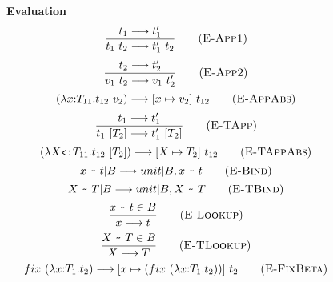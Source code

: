 \documentclass{report}
\newcommand{\subty}{\texttt{{\raisebox{-.7pt}{<}:}}}
\newcommand{\ty}{{:}}
\newcommand{\bind}{~\texttt{\textasciitilde}~}
\begin{document}
\begin{figure}
  \begin{multicols}{2}
    \textbf{Evaluation}\hfill {}
    \begin{equation}
      \frac{t_1\longrightarrow t_1'}{t_1~t_2\longrightarrow t_1'~t_2}
      \tag{\textsc{E-App1}}
      \label{eapp1}
    \end{equation}
    \begin{equation}
      \frac{t_2\longrightarrow t_2'}{v_1~t_2\longrightarrow v_1~t_2'}
      \tag{\textsc{E-App2}}
      \label{eapp2}
    \end{equation}
    \begin{equation}
      (\lambda x\ty T_{11}.t_{12}~v_2)\longrightarrow [x\mapsto v_2]~t_{12}
      \tag{\textsc{E-AppAbs}}
      \label{eappabs}
    \end{equation}
    \begin{equation}
      \frac{t_1\longrightarrow t_1'}{t_1~[T_2]\longrightarrow t_1'~[T_2]}
      \tag{\textsc{E-TApp}}
      \label{etapp}
    \end{equation}
    \begin{equation}
      (\lambda X\subty T_{11}.t_{12}~[T_2])\longrightarrow [X\mapsto T_2]~t_{12}
      \tag{\textsc{E-TAppAbs}}
      \label{etappabs}
    \end{equation}
    \begin{equation}
      x\bind t | B\longrightarrow unit | B, x \bind t
      \tag{\textsc{E-Bind}}
      \label{ebind}
    \end{equation}
    \begin{equation}
      X\bind T | B\longrightarrow unit | B, X \bind T
      \tag{\textsc{E-TBind}}
      \label{etbind}
    \end{equation}
    \begin{equation}
      \frac{x\bind t \in B}{x \longrightarrow t}
      \tag{\textsc{E-Lookup}}
      \label{elookup}
    \end{equation}
    \begin{equation}
      \frac{X\bind T \in B}{X \longrightarrow T}
      \tag{\textsc{E-TLookup}}
      \label{etlookup}
    \end{equation}
    \begin{equation}
      fix~(\lambda x\ty T_1.t_2)\longrightarrow[x\mapsto (fix~(\lambda x\ty T_1.t_2))]~t_2
      \tag{\textsc{E-FixBeta}}
      \label{efixbeta}
    \end{equation}
    \begin{equation}

\end{equation}
\end{multicols}
\end{figure}
\end{document}

